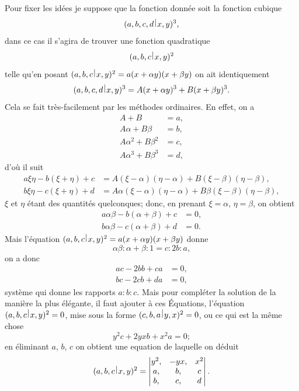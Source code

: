 \documentclass[11pt,a4paper]{book}
\theoremstyle{plain}
\newcommand{\wrule}{\hspace{-0.1em}\mid\hspace{-0.1em}}
\begin{document}
Pour fixer les id\'{e}es je suppose que la fonction donn\'{e}e soit la fonction cubique
\[
(a,b,c,d\,\raisebox{0.5ex}{$\wrule$}\,x,y)^3,
\]
dans ce cas il s'agira de trouver une fonction quadratique
\[
(a,b,c\,\raisebox{0.5ex}{$\wrule$}\,x,y)^2
\]
telle qu'en posant $(a,b,c\,\raisebox{0.5ex}{$\wrule$}\,x,y)^2=a(x+\alpha y)(x+\beta y)$ on ait identiquement
\[
(a,b,c,d\,\raisebox{0.5ex}{$\wrule$}\,x,y)^3=A(x+\alpha y)^3+B(x+\beta y)^3.
\]
Cela se fait tr\`{e}s-facilement par les m\'{e}thodes ordinaires. En effet, on a
\begin{align*}
A+B&=a,\\
A\alpha+B\beta&=b,\\
A\alpha^2+B\beta^2&=c,\\
A\alpha^3+B\beta^3&=d,
\end{align*}
d'o\`{u} il suit
\begin{align*}
a\xi\eta-b(\xi+\eta)+c&=A(\xi-\alpha)(\eta-\alpha)+B(\xi-\beta)(\eta-\beta),\\
b\xi\eta-c(\xi+\eta)+d&=A\alpha(\xi-\alpha)(\eta-\alpha)+B\beta(\xi-\beta)(\eta-\beta),
\end{align*}
$\xi$ et $\eta$ \'{e}tant des quantit\'{e}s quelconques; donc, en prenant $\xi=\alpha$, $\eta=\beta$, on obtient
\begin{align*}
a\alpha\beta-b(\alpha+\beta)+c&=0,\\
b\alpha\beta-c(\alpha+\beta)+d&=0.
\end{align*}
Mais l'\'{e}quation $(a,b,c\,\raisebox{0.5ex}{$\wrule$}\,x,y)^2=a(x+\alpha y)(x+\beta y)$ donne
\[
\alpha\beta:\alpha+\beta:1=c:2b:a,
\]
on a donc
\begin{align*}
ac-2bb+ca&=0,\\
bc-2cb+da&=0,
\end{align*}
syst\`{e}me qui donne les rapports $a:b:c$. Mais pour compl\'{e}ter la solution de la mani\`{e}re la plus \'{e}l\'{e}gante, il faut ajouter \`{a} ces \'{E}quations, l'\'{e}quation $(a,b,c\,\raisebox{0.5ex}{$\wrule$}\,x,y)^2=0$, mise sous la forme $(c,b,a\,\raisebox{0.5ex}{$\wrule$}\,y,x)^2=0$, ou ce qui est la m\^{e}me chose
\[
y^2c+2yxb+x^2a=0;
\]
en \'{e}liminant $a$, $b$, $c$ on obtient une equation de laquelle on d\'{e}duit
\[
(a,b,c\,\raisebox{0.5ex}{$\wrule$}\,x,y)^2=\begin{vmatrix}
y^2, & -yx, & x^2\\
a, & b, & c\\
b, & c, & d
\end{vmatrix}.
\]
\end{document}
